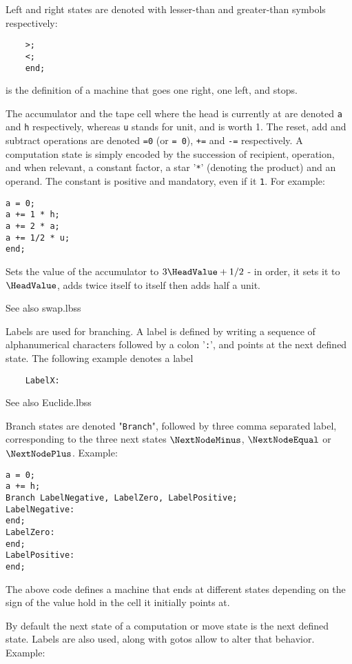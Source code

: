 Left and right states are denoted with lesser-than and greater-than symbols respectively:
\begin{verbatim}
	>;
	<;
	end;
\end{verbatim}
is the definition of a machine that goes one right, one left, and stops.


The accumulator and the tape cell where the head is currently at are denoted \texttt{a} and \texttt{h} respectively, 
whereas \texttt{u} stands for unit, and is worth 1.
The reset, add and subtract operations are denoted \texttt{=0} (or \texttt{= 0}), \texttt{+=} and \texttt{-=} respectively.
A computation state is simply encoded by the succession of recipient, operation, and when relevant, a constant factor, a star '\texttt{*}' (denoting the product) and an operand.
The constant is positive and mandatory, even if it \texttt{1}.
For example:
\begin{verbatim}
a = 0;
a += 1 * h;
a += 2 * a;
a += 1/2 * u;
end;
\end{verbatim}
Sets the value of the accumulator to $3 \HeadValue + 1/2$ - in order, it sets it to $\HeadValue$, adds twice itself to itself then adds half a unit.

See also swap.lbss

Labels are used for branching.
A label is defined by writing a sequence of alphanumerical characters followed by a colon '\texttt{:}', and points at the next defined state.
The following example denotes a label
\begin{verbatim}
	LabelX:
\end{verbatim}

See also Euclide.lbss

Branch states are denoted "\texttt{Branch}", followed by three comma separated label, corresponding to the three next states $\NextNodeMinus$, $\NextNodeEqual$ or $\NextNodePlus$.
Example:
\begin{verbatim}
a = 0;
a += h;
Branch LabelNegative, LabelZero, LabelPositive;
LabelNegative:
end;
LabelZero:
end;
LabelPositive:
end;
\end{verbatim}
The above code defines a machine that ends at different states depending on the sign of the value hold in the cell it initially points at.

By default the next state of a computation or move state is the next defined state.
Labels are also used, along with gotos allow to alter that behavior.
Example:

